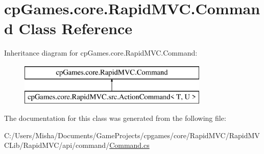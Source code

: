 \hypertarget{classcp_games_1_1core_1_1_rapid_m_v_c_1_1_command}{}\section{cp\+Games.\+core.\+Rapid\+M\+V\+C.\+Command Class Reference}
\label{classcp_games_1_1core_1_1_rapid_m_v_c_1_1_command}
Inheritance diagram for cp\+Games.\+core.\+Rapid\+M\+V\+C.\+Command\+:\begin{figure}[H]
\begin{center}
\leavevmode
\includegraphics[height=2.000000cm]{classcp_games_1_1core_1_1_rapid_m_v_c_1_1_command}
\end{center}
\end{figure}


The documentation for this class was generated from the following file\+:\begin{DoxyCompactItemize}
\item 
C\+:/\+Users/\+Misha/\+Documents/\+Game\+Projects/cpgames/core/\+Rapid\+M\+V\+C/\+Rapid\+M\+V\+C\+Lib/\+Rapid\+M\+V\+C/api/command/\mbox{\hyperlink{_command_8cs}{Command.\+cs}}\end{DoxyCompactItemize}
